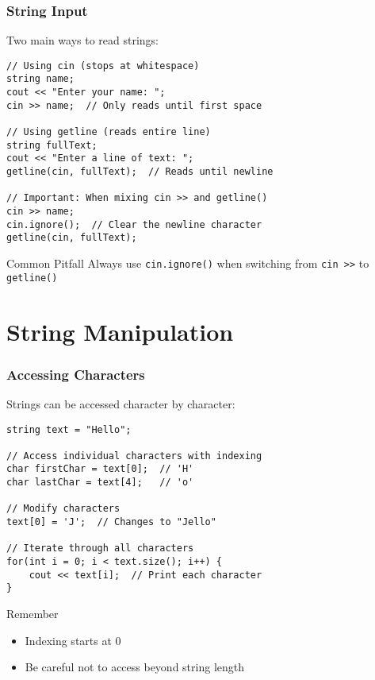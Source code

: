 \documentclass{beamer}
\begin{document}
\begin{frame}[fragile]
    \frametitle{String Input}
    
    Two main ways to read strings:
    
    \begin{lstlisting}
// Using cin (stops at whitespace)
string name;
cout << "Enter your name: ";
cin >> name;  // Only reads until first space

// Using getline (reads entire line)
string fullText;
cout << "Enter a line of text: ";
getline(cin, fullText);  // Reads until newline

// Important: When mixing cin >> and getline()
cin >> name;
cin.ignore();  // Clear the newline character
getline(cin, fullText);
    \end{lstlisting}
    
    \begin{alertblock}{Common Pitfall}
        Always use \texttt{cin.ignore()} when switching from \texttt{cin >>} to \texttt{getline()}
    \end{alertblock}
\end{frame}

\section{String Manipulation}

\begin{frame}[fragile]
    \frametitle{Accessing Characters}
    
    Strings can be accessed character by character:
    
    \begin{lstlisting}
string text = "Hello";

// Access individual characters with indexing
char firstChar = text[0];  // 'H'
char lastChar = text[4];   // 'o'

// Modify characters
text[0] = 'J';  // Changes to "Jello"

// Iterate through all characters
for(int i = 0; i < text.size(); i++) {
    cout << text[i];  // Print each character
}
    \end{lstlisting}
    
    \begin{block}{Remember}
        \begin{itemize}
            \item Indexing starts at 0
            \item Be careful not to access beyond string length
        \end{itemize}
    \end{block}
\end{frame}
\end{document}
